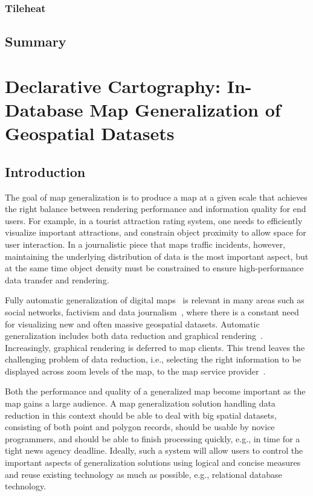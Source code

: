 \documentclass[11pt, oneside]{report}
\begin{document}
\subsection{Tileheat}

\section{Summary}


\chapter{Declarative Cartography: In-Database Map Generalization of Geospatial Datasets}
\label{chapter:cvl}
\lstset{
  language=cvl
}

\section{Introduction}
\label{sec:cvl:introduction}
The goal of map generalization is to produce a map at a given scale that achieves the right balance between rendering performance and information quality for end users. For example, in a tourist attraction rating system, one needs to efficiently visualize important attractions, and constrain object proximity to allow space for user interaction. In a journalistic piece that maps traffic incidents, however, maintaining the underlying distribution of data is the most important aspect, but at the same time object density must be constrained to ensure high-performance data transfer and rendering.

Fully automatic generalization of digital maps~\cite{sarma2012fusiontables,nutanong2012multiresolution} is relevant in many areas such as social networks, factivism and data journalism~\cite{cohen2011journalism,bono,sankaranarayanan2009twitterstand}, where there is a constant need for visualizing new and often massive geospatial datasets. Automatic generalization includes both data reduction and graphical rendering~\cite{weibel1999generalising,gruenreich1985cag}. Increasingly, graphical rendering is deferred to map clients. This trend leaves the challenging problem of data reduction, i.e., selecting the right information to be displayed across zoom levels of the map, to the map service provider~\cite{gaffuri12vectortiles}. 

Both the performance and quality of a generalized map become important as the map gains a large audience. A map generalization solution handling data reduction in this context should be able to deal with big spatial datasets, consisting of both point and polygon records, should be usable by novice programmers, and should be able to finish processing quickly, e.g., in time for a tight news agency deadline. Ideally, such a system will allow users to control the important aspects of generalization solutions using logical and concise measures and reuse existing technology as much as possible, e.g., relational database technology.
\end{document}
